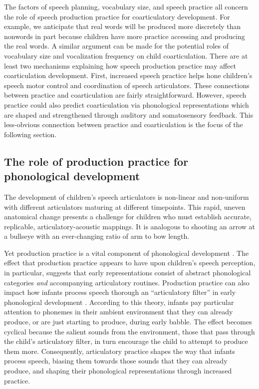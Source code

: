 \documentclass[a4paper,man,natbib,donotrepeattitle, apacite]{apa6}
\begin{document}
The factors of speech planning, vocabulary size, and speech practice all concern the role of speech production practice for coarticulatory development. For example, we anticipate that real words will be produced more discretely than nonwords in part because children have more practice accessing and producing the real words. A similar argument can be made for the potential roles of vocabulary size and vocalization frequency on child coarticulation. There are at least two mechanisms explaining how speech production practice may affect coarticulation development. First, increased speech practice helps hone children's speech motor control and coordination of speech articulators. These connections between practice and coarticulation are fairly straightforward. However, speech practice could also predict coarticulation via phonological representations which are shaped and strengthened through auditory and somatosensory feedback. This less-obvious connection between practice and coarticulation is the focus of the following section.

\subsection{The role of production practice for phonological development}

The development of children's speech articulators is non-linear \cite{vorperianDevelopmentVocalTract2005} and non-uniform \cite{nittrouerEmergenceMatureGestural1993} with different articulators maturing at different timepoints. This rapid, uneven anatomical change presents a challenge for children who must establish accurate, replicable, articulatory-acoustic mappings. It is analogous to shooting an arrow at a bullseye with an ever-changing ratio of arm to bow length. 

Yet production practice is a vital component of phonological development \cite{brudererSensorimotorInfluencesSpeech2015,davisEmergenceDiscretePerceptualMotor2019,keren-portnoyRoleVocalPractice2010,mcallisterbyunMotorInfluencesGrammar2016,mennChallengesTheoriesCharges2013,vihmanLearningWordsLearning2017,zamunerReverseProductionEffect2018}. The effect that production practice appears to have upon children's speech perception, in particular, suggests that early representations consist of abstract phonological categories \textit{and} accompanying articulatory routines. Production practice can also impact how infants process speech thorough an ``articulatory filter'' in early phonological development \cite{depaolisProductionPatternsInfluence2011,depaolisInfluenceBabblingPatterns2013,laingBabbleWordsInfants2020,vihmanVariablePathsEarly1993,vihmanLearningWordsLearning2017}. According to this theory, infants pay particular attention to phonemes in their ambient environment that they can already produce, or are just starting to produce, during early babble. The effect becomes cyclical because the salient sounds from the environment, those that pass through the child's articulatory filter, in turn encourage the child to attempt to produce them more. Consequently, articulatory practice shapes the way that infants process speech, biasing them towards those sounds that they can already produce, and shaping their phonological representations through increased practice. 
\end{document}
